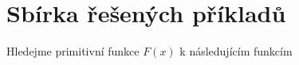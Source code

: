      

  \section{Sbírka řešených příkladů}
    Hledejme primitivní funkce \(F(x)\) k následujícím funkcím
    
    
    
    
